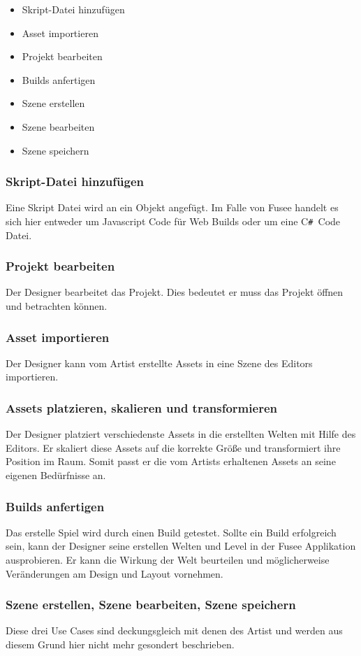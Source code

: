 \documentclass[pagesize, paper=a4, fontsize=12pt, titlepage=true, headings=small, headnosepline, abstractoff, liststotoc, nochapterprefix, plainheadsepline, twoside]{scrreprt}
\newcommand{\CSS}{C\texttt{\# }}
\begin{document}
\begin{itemize}
\item Skript-Datei hinzufügen
\item Asset importieren
\item Projekt bearbeiten
\item Builds anfertigen
\item Szene erstellen
\item Szene bearbeiten
\item Szene speichern
\end{itemize}

\subsubsection{Skript-Datei hinzufügen}
Eine Skript Datei wird an ein Objekt angefügt. Im Falle von Fusee handelt es sich hier entweder um Javascript Code für Web Builds oder um eine \CSS Code Datei.
\subsubsection{Projekt bearbeiten}
Der Designer bearbeitet das Projekt. Dies bedeutet er muss das Projekt öffnen und betrachten können.
\subsubsection{Asset importieren}
Der Designer kann vom Artist erstellte Assets in eine Szene des Editors importieren. 
\subsubsection{Assets platzieren, skalieren und transformieren}
Der Designer platziert verschiedenste Assets in die erstellten Welten mit Hilfe des Editors. Er skaliert diese Assets auf die korrekte Größe und transformiert ihre Position im Raum. Somit passt er die vom Artists erhaltenen Assets an seine eigenen Bedürfnisse an. 
\subsubsection{Builds anfertigen}
Das erstelle Spiel wird durch einen Build getestet. Sollte ein Build erfolgreich sein, kann der Designer seine erstellen Welten und Level in der Fusee Applikation ausprobieren. Er kann die Wirkung der Welt beurteilen und möglicherweise Veränderungen am Design und Layout vornehmen.
\subsubsection{Szene erstellen, Szene bearbeiten, Szene speichern}
Diese drei Use Cases sind deckungsgleich mit denen des Artist und werden aus diesem Grund hier nicht mehr gesondert beschrieben.
\end{document}
